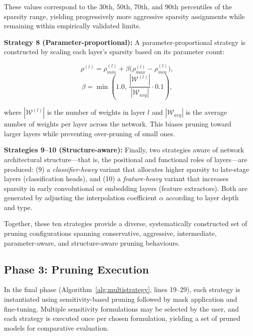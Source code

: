 \documentclass[11pt, conference]{IEEEtran}
\begin{document}
These values correspond to the 30th, 50th, 70th, and 90th percentiles of the sparsity range, yielding progressively more aggressive sparsity assignments while remaining within empirically validated limits.

\textbf{Strategy 8 (Parameter-proportional):} A parameter-proportional strategy is constructed by scaling each layer's sparsity based on its parameter count:

\begin{equation}
\rho^{(l)} = \rho_{min}^{(l)} + \beta\big(\rho_{max}^{(l)} - \rho_{min}^{(l)}\big),
\end{equation}
\begin{equation}
\beta = \min\left(1.0,\, \frac{|\mathcal{W}^{(l)}|}{|\mathcal{W}_{avg}|} \cdot 0.1\right),
\end{equation}

where $|\mathcal{W}^{(l)}|$ is the number of weights in layer $l$ and $|\mathcal{W}_{avg}|$ is the average number of weights per layer across the network. This biases pruning toward larger layers while preventing over-pruning of small ones.

\textbf{Strategies 9--10 (Structure-aware):} Finally, two strategies aware of network architectural structure—that is, the positional and functional roles of layers—are produced: (9) a \emph{classifier-heavy} variant that allocates higher sparsity to late-stage layers (classification heads), and (10) a \emph{feature-heavy} variant that increases sparsity in early convolutional or embedding layers (feature extractors). Both are generated by adjusting the interpolation coefficient $\alpha$ according to layer depth and type.

Together, these ten strategies provide a diverse, systematically constructed set of pruning configurations spanning conservative, aggressive, intermediate, parameter-aware, and structure-aware pruning behaviours.

\subsection{Phase 3: Pruning Execution}

In the final phase (Algorithm~\ref{alg:multistrategy}, lines 19--29), each strategy is instantiated using sensitivity-based pruning followed by mask application and fine-tuning. Multiple sensitivity formulations may be selected by the user, and each strategy is executed once per chosen formulation, yielding a set of pruned models for comparative evaluation.
\end{document}
